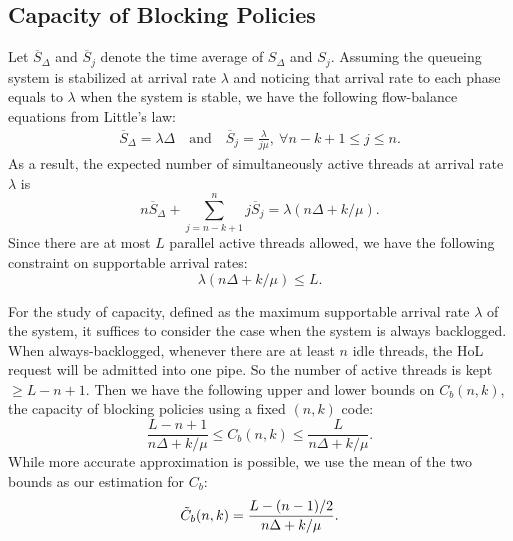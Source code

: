 \documentclass[journal]{IEEEtran}
\begin{document}
  

\subsection{Capacity of Blocking Policies}
\label{ssec:capBlocking}
Let $\overline{S}_{\Delta}$ and $\overline{S}_j$ denote the time average of  $S_{\Delta}$ and $S_j$. 
Assuming the queueing system is stabilized at arrival rate $\lambda$ and noticing that arrival rate to each phase equals to $\lambda$ when the system is stable, we have the following flow-balance equations from Little's law:
\begin{align*}
\overline{S}_{\Delta}  = \lambda\Delta
\text{~~~and~~~}
\overline{S}_j =  \frac{\lambda}{j\mu},~\forall n-k+1\le j \le n .
\end{align*}
As a result, the expected number of simultaneously active threads at arrival rate $\lambda$ is
\begin{equation*}
n\overline{S}_{\Delta} + \sum_{j=n-k+1}^n j\overline{S}_j = \lambda(n\Delta+k/\mu).
\end{equation*}
Since there are at most $L$ parallel active threads allowed, we have the following constraint on supportable arrival rates:
\begin{equation}
\lambda(n\Delta+k/\mu) \le L.
\label{eq:blocking:thread-bound}
\end{equation}

For the study of  capacity, 
defined as the maximum supportable arrival rate $\lambda$ of the system, it suffices to consider the case when the system is always backlogged. When always-backlogged, whenever there are at least $n$ idle threads, the HoL request will be admitted into one pipe. So the number of active threads is kept $\ge L-n+1$. Then we have the following upper and lower bounds on $C_b(n,k)$, the capacity of blocking policies using a fixed $(n,k)$ code:
\begin{equation}
\frac{L-n+1}{n\Delta + k/\mu }\le C_b(n,k) \le \frac{L}{n\Delta + k/\mu}.
\label{eq:blocking:cap-bound}
\end{equation}
While more accurate approximation is possible, we use the mean of  the two bounds as our estimation for $C_b$:
\begin{equation*}
\tilde{C}_b(n,k) 
=\frac{L - (n-1)/2}{n\Delta + k/\mu}.
\end{equation*}
\end{document}

